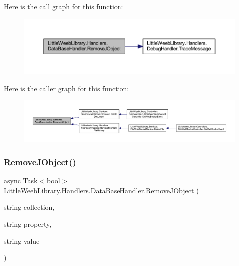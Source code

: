 Here is the call graph for this function\+:\nopagebreak
\begin{figure}[H]
\begin{center}
\leavevmode
\includegraphics[width=350pt]{class_little_weeb_library_1_1_handlers_1_1_data_base_handler_a7821535a003c7675c09ba846bd9502ca_cgraph}
\end{center}
\end{figure}
Here is the caller graph for this function\+:\nopagebreak
\begin{figure}[H]
\begin{center}
\leavevmode
\includegraphics[width=350pt]{class_little_weeb_library_1_1_handlers_1_1_data_base_handler_a7821535a003c7675c09ba846bd9502ca_icgraph}
\end{center}
\end{figure}
\mbox{\label{class_little_weeb_library_1_1_handlers_1_1_data_base_handler_ac9938b8d47b353d15c8e77e94849896e}} 
\subsubsection{\texorpdfstring{Remove\+J\+Object()}{RemoveJObject()}\hspace{0.1cm}{\footnotesize\ttfamily [2/2]}}
{\footnotesize\ttfamily async Task$<$bool$>$ Little\+Weeb\+Library.\+Handlers.\+Data\+Base\+Handler.\+Remove\+J\+Object (\begin{DoxyParamCaption}\item[{string}]{collection,  }\item[{string}]{property,  }\item[{string}]{value }\end{DoxyParamCaption})}



